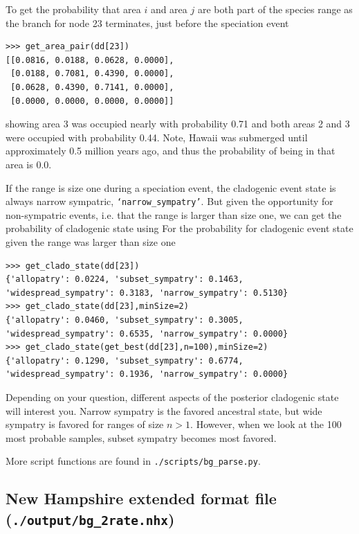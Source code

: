 To get the probability that area $i$ and area $j$ are both part of the species range as the branch for node 23 terminates, just before the speciation event
\begin{snugshade}
\begin{lstlisting}
>>> get_area_pair(dd[23])
[[0.0816, 0.0188, 0.0628, 0.0000],
 [0.0188, 0.7081, 0.4390, 0.0000],
 [0.0628, 0.4390, 0.7141, 0.0000],
 [0.0000, 0.0000, 0.0000, 0.0000]]
\end{lstlisting}
\end{snugshade}
showing area 3 was occupied nearly with probability 0.71 and both areas 2 and 3 were occupied with probability 0.44.
Note, Hawaii was submerged until approximately 0.5 million years ago, and thus the probability of being in that area is 0.0.

If the range is size one during a speciation event, the cladogenic event state is always narrow sympatric, {\tt `narrow\_sympatry'}.
But given the opportunity for non-sympatric events, i.e. that the range is larger than size one, we can get the probability of cladogenic state using
For the probability for cladogenic event state given the range was larger than size one
\begin{snugshade}
\begin{lstlisting}
>>> get_clado_state(dd[23])
{'allopatry': 0.0224, 'subset_sympatry': 0.1463, 'widespread_sympatry': 0.3183, 'narrow_sympatry': 0.5130}
>>> get_clado_state(dd[23],minSize=2)
{'allopatry': 0.0460, 'subset_sympatry': 0.3005, 'widespread_sympatry': 0.6535, 'narrow_sympatry': 0.0000}
>>> get_clado_state(get_best(dd[23],n=100),minSize=2)
{'allopatry': 0.1290, 'subset_sympatry': 0.6774, 'widespread_sympatry': 0.1936, 'narrow_sympatry': 0.0000}
\end{lstlisting}
\end{snugshade}

Depending on your question, different aspects of the posterior cladogenic state will interest you.
Narrow sympatry is the favored ancestral state, but wide sympatry is favored for ranges of size $n>1$.
However, when we look at the 100 most probable samples, subset sympatry becomes most favored.

More script functions are found in {\tt ./scripts/bg\_parse.py}.

\subsection{New Hampshire extended format file (\texttt{./output/bg\_2rate.nhx})}

